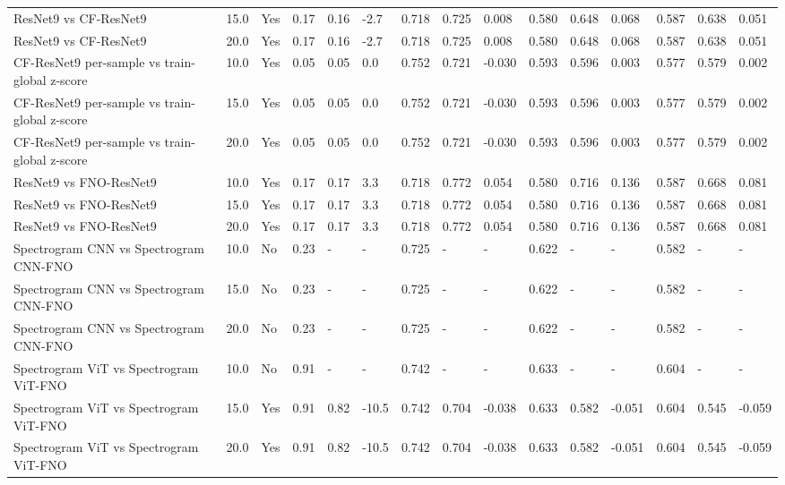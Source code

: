 \begin{longtable}{lllllllllllllll}
ResNet9 vs CF-ResNet9 & 15.0 & Yes & 0.17 & 0.16 & -2.7 & 0.718 & 0.725 & 0.008 & 0.580 & 0.648 & 0.068 & 0.587 & 0.638 & 0.051 \\
ResNet9 vs CF-ResNet9 & 20.0 & Yes & 0.17 & 0.16 & -2.7 & 0.718 & 0.725 & 0.008 & 0.580 & 0.648 & 0.068 & 0.587 & 0.638 & 0.051 \\
CF-ResNet9 per-sample vs train-global z-score & 10.0 & Yes & 0.05 & 0.05 & 0.0 & 0.752 & 0.721 & -0.030 & 0.593 & 0.596 & 0.003 & 0.577 & 0.579 & 0.002 \\
CF-ResNet9 per-sample vs train-global z-score & 15.0 & Yes & 0.05 & 0.05 & 0.0 & 0.752 & 0.721 & -0.030 & 0.593 & 0.596 & 0.003 & 0.577 & 0.579 & 0.002 \\
CF-ResNet9 per-sample vs train-global z-score & 20.0 & Yes & 0.05 & 0.05 & 0.0 & 0.752 & 0.721 & -0.030 & 0.593 & 0.596 & 0.003 & 0.577 & 0.579 & 0.002 \\
ResNet9 vs FNO-ResNet9 & 10.0 & Yes & 0.17 & 0.17 & 3.3 & 0.718 & 0.772 & 0.054 & 0.580 & 0.716 & 0.136 & 0.587 & 0.668 & 0.081 \\
ResNet9 vs FNO-ResNet9 & 15.0 & Yes & 0.17 & 0.17 & 3.3 & 0.718 & 0.772 & 0.054 & 0.580 & 0.716 & 0.136 & 0.587 & 0.668 & 0.081 \\
ResNet9 vs FNO-ResNet9 & 20.0 & Yes & 0.17 & 0.17 & 3.3 & 0.718 & 0.772 & 0.054 & 0.580 & 0.716 & 0.136 & 0.587 & 0.668 & 0.081 \\
Spectrogram CNN vs Spectrogram CNN-FNO & 10.0 & No & 0.23 & - & - & 0.725 & - & - & 0.622 & - & - & 0.582 & - & - \\
Spectrogram CNN vs Spectrogram CNN-FNO & 15.0 & No & 0.23 & - & - & 0.725 & - & - & 0.622 & - & - & 0.582 & - & - \\
Spectrogram CNN vs Spectrogram CNN-FNO & 20.0 & No & 0.23 & - & - & 0.725 & - & - & 0.622 & - & - & 0.582 & - & - \\
Spectrogram ViT vs Spectrogram ViT-FNO & 10.0 & No & 0.91 & - & - & 0.742 & - & - & 0.633 & - & - & 0.604 & - & - \\
Spectrogram ViT vs Spectrogram ViT-FNO & 15.0 & Yes & 0.91 & 0.82 & -10.5 & 0.742 & 0.704 & -0.038 & 0.633 & 0.582 & -0.051 & 0.604 & 0.545 & -0.059 \\
Spectrogram ViT vs Spectrogram ViT-FNO & 20.0 & Yes & 0.91 & 0.82 & -10.5 & 0.742 & 0.704 & -0.038 & 0.633 & 0.582 & -0.051 & 0.604 & 0.545 & -0.059 \\
\end{longtable}
